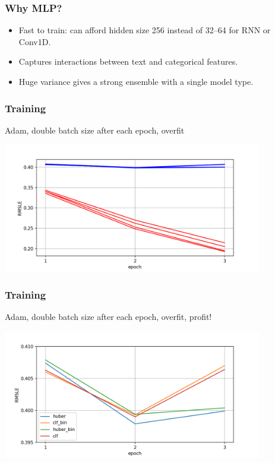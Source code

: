 \begin{frame}
    \frametitle{Why MLP?}

    \begin{itemize}
        \item Fast to train: can afford hidden size 256 instead of 32--64 for RNN or Conv1D.
        \item Captures interactions between text and categorical features.
        \item Huge variance gives a strong ensemble with a single model type.
    \end{itemize}

\end{frame}


\begin{frame}
    \frametitle{Training}

    Adam, double batch size after each epoch, overfit

    \includegraphics[width=0.85\textwidth]{img/learning_curve_1.png}

\end{frame}

\begin{frame}
    \frametitle{Training}

    Adam, double batch size after each epoch, overfit, profit!

    \includegraphics[width=0.85\textwidth]{img/learning_curve_2.png}

\end{frame}


